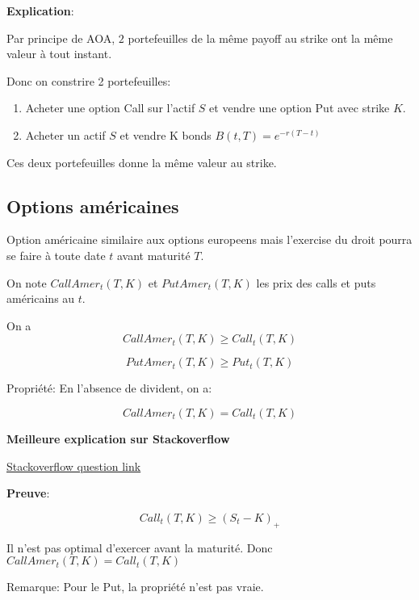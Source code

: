 \documentclass{article}
\theoremstyle{plain}
\theoremstyle{definition}
\begin{document}
\textbf{Explication}:

Par principe de AOA, $2$ portefeuilles de la m\^eme payoff au strike ont la m\^eme valeur \`a tout instant.

Donc on constrire 2 portefeuilles:
\begin{enumerate}
	\item Acheter une option Call sur l'actif $S$ et vendre une option Put avec strike $K$.
	\item Acheter un actif $S$ et vendre K bonds $B(t,T)=e^{-r(T-t)}$
\end{enumerate}
Ces deux portefeuilles donne la m\^eme valeur au strike. 
	
\subsection{Options am\'ericaines}
Option am\'ericaine similaire aux options europeens mais l'exercise du droit pourra se faire \`a toute date $t$ avant maturit\'e $T$.

On note $CallAmer_t(T, K)$ et $PutAmer_t(T, K)$ les prix des calls et puts am\'ericains au $t$.

On a 
\begin{equation}
CallAmer_t(T,K) \geq Call_t(T, K)
\end{equation}
 
\begin{equation}
PutAmer_t(T, K) \geq Put_t(T, K)
\end{equation}

Propri\'et\'e:
En l'absence de divident, on a:

\begin{equation}
CallAmer_t(T, K) = Call_t(T, K)
\end{equation}

\textbf{Meilleure explication sur Stackoverflow}

{\color{blue}\href{http://money.stackexchange.com/questions/5161/why-are-american-style-options-worth-more-than-european-style-options}{Stackoverflow question link}}

\textbf{Preuve}:

\begin{equation}
Call_t(T, K) \geq (S_t- K)_+
\end{equation}

Il n'est pas optimal d'exercer avant la maturit\'e. Donc $CallAmer_t(T, K) = Call_t(T, K)$

Remarque: Pour le Put, la propri\'et\'e n'est pas vraie.
\end{document}
